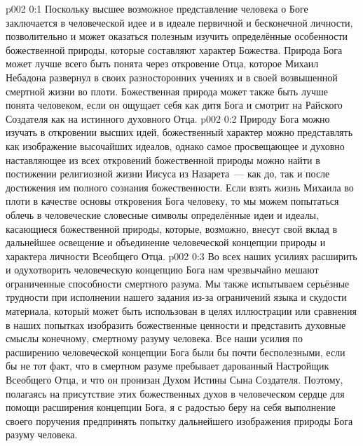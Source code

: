 \author{Божественный Советник}
\vs p002 0:1 Поскольку высшее возможное представление человека о Боге заключается в человеческой идее и в идеале первичной и бесконечной личности, позволительно и может оказаться полезным изучить определённые особенности божественной природы, которые составляют характер Божества. Природа Бога может лучше всего быть понята через откровение Отца, которое Михаил Небадона развернул в своих разносторонних учениях и в своей возвышенной смертной жизни во плоти. Божественная природа может также быть лучше понята человеком, если он ощущает себя как дитя Бога и смотрит на Райского Создателя как на истинного духовного Отца.
\vs p002 0:2 Природу Бога можно изучать в откровении высших идей, божественный характер можно представлять как изображение высочайших идеалов, однако самое просвещающее и духовно наставляющее из всех откровений божественной природы можно найти в постижении религиозной жизни Иисуса из Назарета~--- как до, так и после достижения им полного сознания божественности. Если взять жизнь Михаила во плоти в качестве основы откровения Бога человеку, то мы можем попытаться облечь в человеческие словесные символы определённые идеи и идеалы, касающиеся божественной природы, которые, возможно, внесут свой вклад в дальнейшее освещение и объединение человеческой концепции природы и характера личности Всеобщего Отца.
\vs p002 0:3 Во всех наших усилиях расширить и одухотворить человеческую концепцию Бога нам чрезвычайно мешают ограниченные способности смертного разума. Мы также испытываем серьёзные трудности при исполнении нашего задания из\hyp{}за ограничений языка и скудости материала, который может быть использован в целях иллюстрации или сравнения в наших попытках изобразить божественные ценности и представить духовные смыслы конечному, смертному разуму человека. Все наши усилия по расширению человеческой концепции Бога были бы почти бесполезными, если бы не тот факт, что в смертном разуме пребывает дарованный Настройщик Всеобщего Отца, и что он пронизан Духом Истины Сына Создателя. Поэтому, полагаясь на присутствие этих божественных духов в человеческом сердце для помощи расширения концепции Бога, я с радостью беру на себя выполнение своего поручения предпринять попытку дальнейшего изображения природы Бога разуму человека.
